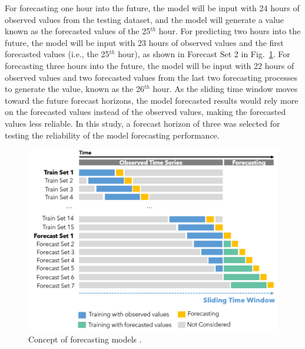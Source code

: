 For forecasting one hour into the future, the model will be input with 24 hours of observed values from the testing dataset, and the model will generate a value known as the forecasted values of the 25$^{th}$ hour. For predicting two hours into the future, the model will be input with 23 hours of observed values and the first forecasted values (i.e., the 25$^{th}$ hour), as shown in Forecast Set 2 in Fig.~\ref{fig:forecast-concept}. For forecasting three hours into the future, the model will be input with 22 hours of observed values and two forecasted values from the last two forecasting processes to generate the value, known as the 26$^{th}$ hour. As the sliding time window moves toward the future forecast horizons, the model forecasted results would rely more on the forecasted values instead of the observed values, making the forecasted values less reliable. In this study, a forecast horizon of three was selected for testing the reliability of the model forecasting performance.

\begin{figure}[!ht]
  \centering
  \includegraphics[width=0.9\columnwidth]{imgs/forecast-concept.png}
  \caption{Concept of forecasting models \citep{liuTimeSeriesForecasting2020}.}
  \label{fig:forecast-concept}
\end{figure}

